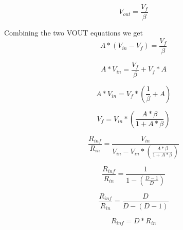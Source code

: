 \documentclass[10pt,a4paper]{article}
\begin{document}
\begin{multicols}{2}
\begin{equation}
\label{eq:VOUT_VF2}
V_{out} =  \frac{V_f}{\beta}
\end{equation}

Combining the two VOUT equations we get
\begin{equation}
\label{eq:VF_VIN}
A * (V_{in} - V_f) =  \frac{V_f}{\beta}
\end{equation}

\begin{equation}
\label{eq:VF_VIN2}
A * V_{in} =  \frac{V_f}{\beta} + V_f *A
\end{equation}

\begin{equation}
\label{eq:VF_VIN3}
A * V_{in} =  V_f * (\frac{1}{\beta} + A)
\end{equation}

\begin{equation}
\label{eq:VF_VIN4VF}
V_f  =  V_{in} * (\frac{A * \beta}{1+ A * \beta})
\end{equation}

\begin{equation}
\label{eq:VF_VIN5}
\frac{R_{inf}}{R_{in}} = \frac{V_{in}}{V_{in} - V_{in} * (\frac{A * \beta}{1+ A * \beta})}
\end{equation}

\begin{equation}
\label{eq:VF_VIN6}
\frac{R_{inf}}{R_{in}} = \frac{1}{1 -  (\frac{D-1}{D})}
\end{equation}

\begin{equation}
\label{eq:VF_VIN7}
\frac{R_{inf}}{R_{in}} = \frac{D}{D - (D-1)}
\end{equation}

\begin{equation}
\label{eq:VF_RINF}
R_{inf} = D * R_{in}
\end{equation}
\end{multicols}
\end{document}
